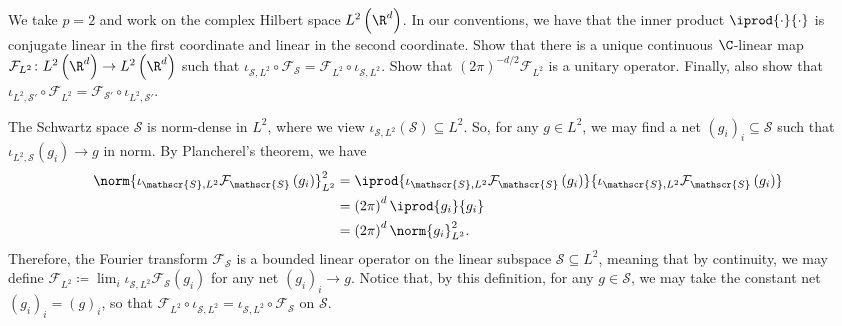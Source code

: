 \documentclass[10pt]{mypackage}
\renewcommand{\coloneq}{\coloneqq}
\begin{document}
\begin{problem}
  We take $p = 2$ and work on the complex Hilbert space $L^2\left( \R^d \right)$. In our conventions, we have that the inner product $ \iprod{\cdot}{\cdot} $ is conjugate linear in the first coordinate and linear in the second coordinate. Show that there is a unique continuous $\C$-linear map $ \mathcal{F}_{L^2}\colon L^2\left( \R^d \right)\to L^2\left( \R^d \right) $ such that $\iota_{\mathscr{S},L^2}\circ \mathcal{F}_{\mathscr{S}} = \mathcal{F}_{L^2}\circ \iota_{\mathscr{S},L^2}$. Show that $\left( 2\pi \right)^{-d/2}\mathcal{F}_{L^2}$ is a unitary operator. Finally, also show that $\iota_{L^2,\mathscr{S}'}\circ \mathcal{F}_{L^2} = \mathcal{F}_{\mathscr{S}'}\circ \iota_{L^2,\mathscr{S}'}$.
\end{problem}
\begin{solution}
  The Schwartz space $\mathscr{S}$ is norm-dense in $L^2$, where we view $\iota_{\mathscr{S},L^2}\left( \mathscr{S} \right)\subseteq L^2$. So, for any $g\in L^2$, we may find a net $\left( g_i \right)_i\subseteq \mathscr{S}$ such that $\iota_{L^2,\mathscr{S}}\left( g_i \right)\to g$ in norm. By Plancherel's theorem, we have
  \begin{align*}
    \norm{\iota_{\mathscr{S},L^2} \mathcal{F}_{\mathscr{S}}\left( g_i \right)}_{L^2}^2 &= \iprod{\iota_{\mathscr{S},L^2}\mathcal{F}_{\mathscr{S}}\left( g_i \right)}{ \iota_{\mathscr{S},L^2}\mathcal{F}_{\mathscr{S}}\left( g_i \right) }\\
                                                         &= \left( 2\pi \right)^{d}\iprod{g_i}{g_i}\\
                                                         &= \left( 2\pi \right)^{d}\norm{g_i}_{L^2}^2.
  \end{align*}
  Therefore, the Fourier transform $\mathcal{F}_{\mathscr{S}}$ is a bounded linear operator on the linear subspace $ \mathscr{S}\subseteq L^2 $, meaning that by continuity, we may define $\mathcal{F}_{L^2}\coloneq \lim_{i} \iota_{\mathscr{S},L^2}\mathcal{F}_{\mathscr{S}}\left( g_i \right)$ for any net $\left( g_i \right)_i\to g$. Notice that, by this definition, for any $g\in \mathscr{S}$, we may take the constant net $\left( g_i \right)_{i} = \left( g \right)_{i}$, so that $ \mathcal{F}_{L^2}\circ \iota_{\mathscr{S},L^2} = \iota_{\mathscr{S},L^2}\circ \mathcal{F}_{\mathscr{S}} $ on $\mathscr{S}$.


\end{solution}
\end{document}
